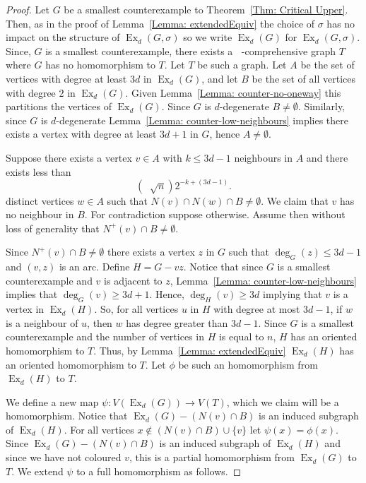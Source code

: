 \documentclass[11pt]{article}
\theoremstyle{definition}
\DeclareMathOperator{\ex}{\text{Ex}}
\DeclareMathOperator{\coe}{6\Big(1+\frac{9d^2}{4}\Big)^{\frac{1}{2}}d}
\DeclareMathOperator{\bound}{\Big( 3d-1, \coe\sqrt{n}\Big)}
\begin{document}
\begin{proof}
    Let $G$ be a smallest counterexample to Theorem~\ref{Thm: Critical Upper}.
    Then, as in the proof of Lemma~\ref{Lemma: extendedEquiv} the choice of $\sigma$ has no impact on the structure of $\ex_d(G,\sigma)$
    so we write $\ex_d(G)$ for $\ex_d(G,\sigma)$.
    Since, $G$ is a smallest counterexample,
    there exists a $\bound$-comprehensive graph $T$ where $G$ has no homomorphism to $T$.
    Let $T$ be such a graph.
    Let $A$ be the set of vertices with degree at least $3d$ in $\ex_d(G)$, and let $B$ be the set of all vertices with degree $2$ in $\ex_d(G)$.
    Given Lemma~\ref{Lemma: counter-no-oneway} this partitions the vertices of $\ex_d(G)$.
    Since $G$ is $d$-degenerate $B\neq \emptyset$.
    Similarly, since $G$ is $d$-degenerate
    Lemma~\ref{Lemma: counter-low-neighbours} implies there exists a vertex with degree at least $3d+1$ in $G$, 
    hence $A\neq \emptyset$.

    Suppose there exists a vertex $v\in A$ with $k\leq 3d-1$ neighbours in $A$
    and there exists less than 
    \[
    (\coe\sqrt{n})2^{-k+(3d-1)}.
    \]
    distinct vertices $w\in A$ such that $N(v)\cap N(w)\cap B \neq \emptyset$.
    We claim that $v$ has no neighbour in $B$.
    For contradiction suppose otherwise.
    Assume then without loss of generality that $N^+(v)\cap B\neq \emptyset$.

    Since $N^+(v)\cap B\neq \emptyset$ there exists a vertex $z$ in $G$
    such that $\deg_G(z) \leq 3d-1$ and $(v,z)$ is an arc.
    Define $H = G-vz$. 
    Notice that since $G$ is a smallest counterexample and $v$ is adjacent to $z$, Lemma~\ref{Lemma: counter-low-neighbours} implies that $\deg_G(v)\geq 3d+1$. Hence, $\deg_H(v)\geq 3d$
    implying that $v$ is a vertex in $\ex_d(H)$.
    So, for all vertices $u$ in $H$ with degree at most $3d-1$, if $w$ is a neighbour of $u$, then $w$ has degree greater than $3d-1$.
    Since $G$ is a smallest counterexample and the number of vertices in $H$ is equal to $n$, $H$ has an oriented homomorphism to $T$.
    Thus, by Lemma~\ref{Lemma: extendedEquiv} $\ex_d(H)$ has an oriented homomorphism to $T$.
    Let $\phi$ be such an homomorphism from $\ex_d(H)$ to $T$.


    We define a new map $\psi: V(\ex_d(G)) \rightarrow V(T)$, which we claim will be a homomorphism.
    Notice that $\ex_d(G) - (N(v)\cap B)$ is an induced subgraph of $\ex_d(H)$.
    For all vertices $x \notin (N(v)\cap B) \cup \{v\}$
    let $\psi(x) = \phi(x)$.
    Since $\ex_d(G) - (N(v)\cap B)$ is an induced subgraph of $\ex_d(H)$
    and since we have not coloured $v$, this is a partial homomorphism from $\ex_d(G)$ to $T$.
    We extend $\psi$ to a full homomorphism as follows.


\end{proof}
\end{document}
